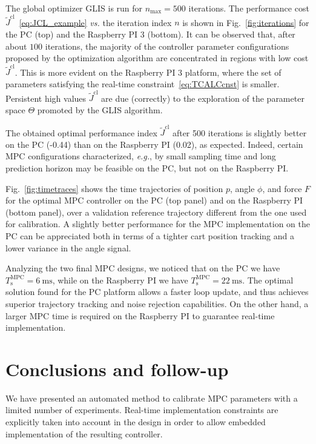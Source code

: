 \documentclass{article}
\newcommand{\TMPC}{T_{\mathrm{s}}^{\mathrm{MPC}}}
\newcommand{\TCALCMPC}{T_{\mathrm{calc}}^{\mathrm{MPC}}}
\newcommand{\JCt}{{\tilde{J}^\mathrm{cl}}}
\begin{document}
The global optimizer GLIS is run for $n_{\mathrm{max}} = 500$ iterations. The performance cost $\JCt$~\eqref{eq:JCL_example} \emph{vs.} the iteration index $n$ is shown in Fig.~\ref{fig:iterations} for the PC (top) and the Raspberry PI 3 (bottom). It can be observed that, after about $100$ iterations, the majority of the controller parameter configurations proposed by the optimization algorithm are concentrated in regions with low cost $\JCt$. 
This is more evident on the Raspberry PI 3 platform, where  the set of parameters satisfying the real-time constraint~\eqref{eq:TCALCcnst} is smaller. 
Persistent high values  $\JCt$ are due (correctly) to the exploration of the parameter space $\Theta$ promoted by the GLIS algorithm. 


The obtained optimal performance index $\JCt$ after 500 iterations is slightly better on the PC (-0.44) than on the Raspberry PI (0.02), as expected. Indeed, certain MPC configurations characterized, \emph{e.g.}, by small sampling time and long prediction horizon may be feasible on the PC, but not on the Raspberry PI.

 Fig.~\ref{fig:timetraces} shows the time trajectories of position $p$, angle $\phi$, and force $F$ for the optimal MPC controller on the PC (top panel) and on the Raspberry PI (bottom panel), over a validation reference trajectory different from the one used for calibration. A slightly better performance for the MPC implementation on the PC can be appreciated both in terms of a tighter cart position tracking and a lower variance in the angle signal. %

  Analyzing the two  final MPC designs, we noticed that on the PC we have $\TMPC= 6~\mathrm{ms}$, while on the Raspberry PI we have $\TMPC= 22~\mathrm{ms}$.   The optimal solution found for the PC platform allows a faster loop update, and thus achieves superior trajectory tracking and noise rejection capabilities.
  On the other hand, a larger MPC time  is required on the Raspberry PI to guarantee real-time implementation. %


  
\section{Conclusions and follow-up}
\label{sec:conclusions}
We have presented an automated method to calibrate MPC parameters with a limited number of experiments.  Real-time implementation constraints are explicitly taken into account in the design in order to allow embedded implementation of the resulting controller. 
\end{document}
